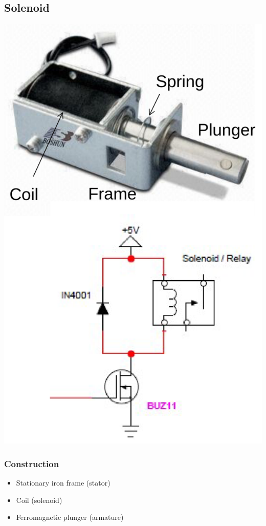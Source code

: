 \documentclass[11pt]{article}
\begin{document}
\subsection{Solenoid}
\label{sec:org420a15a}
\begin{center}
\includegraphics[scale=0.6]{./images/solenoid-diagram.png}
\end{center}

\subsubsection{Construction}
\label{sec:org2758bbe}
\begin{itemize}
\item Stationary iron frame (stator)
\item Coil (solenoid)
\item Ferromagnetic plunger (armature)
\end{itemize}
\end{document}
